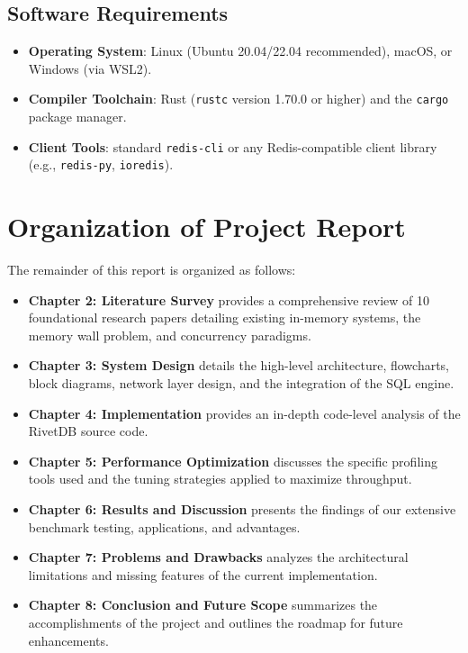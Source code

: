 \subsection{Software Requirements}
\begin{itemize}[leftmargin=2.5em]
    \item \textbf{Operating System}: Linux (Ubuntu 20.04/22.04 recommended), macOS, or Windows (via WSL2).
    \item \textbf{Compiler Toolchain}: Rust (\texttt{rustc} version 1.70.0 or higher) and the \texttt{cargo} package manager.
    \item \textbf{Client Tools}: standard \texttt{redis-cli} or any Redis-compatible client library (e.g., \texttt{redis-py}, \texttt{ioredis}).
\end{itemize}

\section{Organization of Project Report}
The remainder of this report is organized as follows:
\begin{itemize}[leftmargin=2.5em]
    \item \textbf{Chapter 2: Literature Survey} provides a comprehensive review of 10 foundational research papers detailing existing in-memory systems, the memory wall problem, and concurrency paradigms.
    \item \textbf{Chapter 3: System Design} details the high-level architecture, flowcharts, block diagrams, network layer design, and the integration of the SQL engine.
    \item \textbf{Chapter 4: Implementation} provides an in-depth code-level analysis of the RivetDB source code.
    \item \textbf{Chapter 5: Performance Optimization} discusses the specific profiling tools used and the tuning strategies applied to maximize throughput.
    \item \textbf{Chapter 6: Results and Discussion} presents the findings of our extensive benchmark testing, applications, and advantages.
    \item \textbf{Chapter 7: Problems and Drawbacks} analyzes the architectural limitations and missing features of the current implementation.
    \item \textbf{Chapter 8: Conclusion and Future Scope} summarizes the accomplishments of the project and outlines the roadmap for future enhancements.
\end{itemize}

